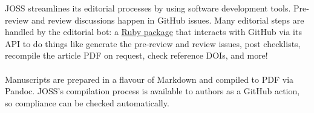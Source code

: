 \documentclass[25pt, a0paper, portrait]{tikzposter}
\begin{document}
\begin{columns}

{JOSS streamlines its editorial processes by using software
  development tools.  Pre-review and review discussions happen in
  GitHub issues.  Many editorial steps are handled by the editorial
  bot: a \href{https://buffy.readthedocs.io/}{Ruby package}
  that interacts with GitHub via its API to do things
  like generate the pre-review and review issues, post checklists,
  recompile the article PDF on request, check reference DOIs, and more! \\
  \\
  Manuscripts are prepared in a flavour of Markdown and compiled to
  PDF via Pandoc.  JOSS's compilation process is available to authors
  as a GitHub action, so compliance can be checked automatically.
}


\end{columns}
\end{document}
